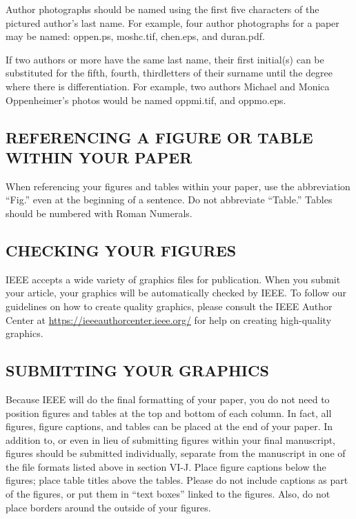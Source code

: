 \documentclass{ieeeojpel}
\begin{document}
Author photographs should be named using the first five characters of the 
pictured author's last name. For example, four author photographs for a 
paper may be named: oppen.ps, moshc.tif, chen.eps, and duran.pdf.

If two authors or more have the same last name, their first initial(s) can 
be substituted for the fifth, fourth, third\textellipsis letters of their surname 
until the degree where there is differentiation. For example, two authors 
Michael and Monica Oppenheimer's photos would be named oppmi.tif, and 
oppmo.eps.

\subsection{REFERENCING A FIGURE OR TABLE WITHIN YOUR PAPER}
When referencing your figures and tables within your paper, use the 
abbreviation ``Fig.'' even at the beginning of a sentence. Do not abbreviate 
``Table.'' Tables should be numbered with Roman Numerals.

\subsection{CHECKING YOUR FIGURES}
IEEE accepts a wide variety of graphics files for publication. When you submit your article, your graphics will be automatically checked by IEEE.
To follow our guidelines on how to create quality graphics, please consult the IEEE Author Center at \underline{https://ieeeauthorcenter.ieee.org/}  
for help on creating high-quality graphics.

\subsection{SUBMITTING YOUR GRAPHICS}
Because IEEE will do the final formatting of your paper, 
you do not need to position figures and tables at the top and bottom of each 
column. In fact, all figures, figure captions, and tables can be placed at 
the end of your paper. In addition to, or even in lieu of submitting figures 
within your final manuscript, figures should be submitted individually, 
separate from the manuscript in one of the file formats listed above in 
section VI-J. Place figure captions below the figures; place table titles 
above the tables. Please do not include captions as part of the figures, or 
put them in ``text boxes'' linked to the figures. Also, do not place borders 
around the outside of your figures.
\end{document}
